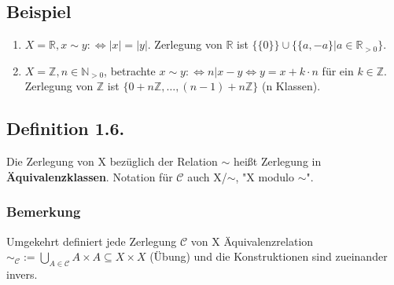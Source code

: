 \documentclass {article}
\begin{document}
\subsection*{Beispiel}
\begin{enumerate}[label=(\alph*)]
\item $X = \mathbb{R}, x \sim y :\Leftrightarrow |x| = |y|$.
Zerlegung von $\mathbb{R}$ ist $\{\{0\}\} \cup \{\{a, -a\} | a \in \mathbb{R}_{>0}\}$.
\item $X = \mathbb{Z}, n \in \mathbb{N}_{>0}$, betrachte $x \sim y :\Leftrightarrow n | x - y \Leftrightarrow y = x + k \cdot n$ für ein $k \in \mathbb{Z}$.
Zerlegung von $\mathbb{Z}$ ist $\{0 + n\mathbb{Z},\ldots, (n - 1) + n\mathbb{Z}\}$ (n Klassen).
\end{enumerate}

\subsection*{Definition 1.6.}
Die Zerlegung von X bezüglich der Relation $\sim$ heißt Zerlegung in \textbf{Äquivalenzklassen}. Notation für $\mathcal{C}$ auch X/$\sim$, "X modulo $\sim$".
\subsubsection*{Bemerkung}
Umgekehrt definiert jede Zerlegung $\mathcal{C}$ von X Äquivalenzrelation $\sim_\mathcal{C} := \bigcup_{A \in \mathcal{C}} A \times A \subseteq X \times X$ (Übung) und die Konstruktionen sind zueinander invers.
\end{document}
